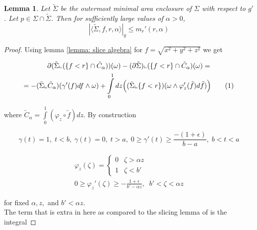 \documentclass{amsart}
\newcommand\numberthis{\addtocounter{equation}{1}\tag{\theequation}}
\newcommand{\ts}{\tilde{\Sigma}}
\newtheorem{lemma}{Lemma}
\theoremstyle{named}
\begin{document}
\begin{lemma} \label{lemma: partial_mass_slice_rate_of_change}
    Let $\tilde{\Sigma}$ be the outermost minimal area enclosure of $\Sigma$ with respect to $g'$. Let $p \in \Sigma \cap \tilde{\Sigma}$. Then for sufficiently large values of $\alpha > 0$, 
    \begin{equation} \nonumber
        |\langle \ts, f, r, \alpha \rangle|_g \leq m_{r}'(r,\alpha)
    \end{equation}
\end{lemma}

\begin{proof}
    Using lemma \ref{lemma: slice algebra} for $f = \sqrt{x^2 + y^2 + z^2}$ we get 
    
    \begin{gather*}
        \partial (\ts \llcorner (\{f < r\} \cap \tilde{C}_{\alpha})) (\omega) - (\partial \ts) \llcorner (\{f < r\} \cap \tilde{C}_{\alpha})(\omega) = \\ = - (\ts \llcorner \tilde{C}_{\alpha})(\gamma'(f)df \wedge \omega) + \int\limits_{0}^{1} dz \Big( (\ts \llcorner \{ f < r \}) (\omega \wedge \varphi_{z}'(\tilde{f})d\tilde{f}) \Big) \numberthis \label{eq: slice_ineq}
    \end{gather*}
    
    where $\tilde{C}_{\alpha} = \int\limits_{0}^{1} (\varphi_z \circ \tilde{f})dz $. By construction
    
    \begin{equation} \nonumber
        \gamma(t) = 1, \; t < b, \; \gamma(t) = 0, \; t > a, \; 0 \geq \gamma'(t) \geq \frac{-(1 + \epsilon)}{b - a}, \; b < t < a 
    \end{equation}
    
    \begin{eqnarray} \nonumber
        \varphi_z (\zeta) = \begin{cases}
            0 & \zeta > \alpha z \\
            1 & \zeta < b'
        \end{cases} \\ \nonumber
        0 \geq \varphi_z ' (\zeta) \geq -\frac{1+\epsilon}{b' - \alpha z}, \;\; b' < \zeta < \alpha z
    \end{eqnarray}
    
    for fixed $\alpha, z,$ and $ b' < \alpha z$. \\
    
    The term that is extra in here as compared to the slicing lemma of \cite{simon} is the integral
    

\end{proof}
\end{document}

